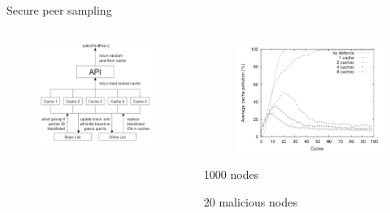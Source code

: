 \begin{frame}{Secure peer sampling}

\begin{columns}
\begin{column}{0.55\textwidth}
\begin{figure}
\includegraphics[width=\textwidth]{sps-architecture}
\end{figure}
\end{column}
\begin{column}{0.45\textwidth}
\begin{figure}
\includegraphics[width=\textwidth]{sps-results}
\end{figure}

\BI
\item 1000 nodes
\item 20 malicious nodes
\EI

\end{column}
\end{columns}


\end{frame}



